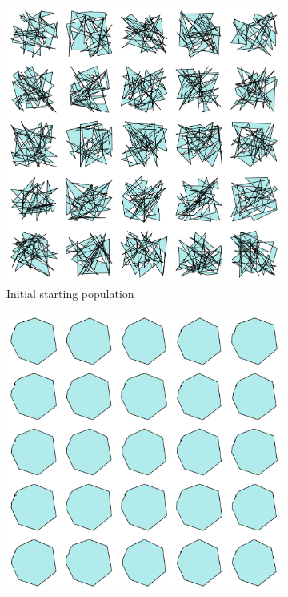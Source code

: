 \documentclass{article}
\begin{document}
\begin{figure}[H]
    \centering
    \begin{subfigure}[b]{0.45\textwidth}
        \centering
        \includegraphics[width=\textwidth]{figures/GAResults/GA4/50point_initial_pop.png}
        \caption{Initial starting population}
        \label{fig:GA4_starting}
    \end{subfigure}
    \hfill
    \begin{subfigure}[b]{0.45\textwidth}
        \centering
        \includegraphics[width=\textwidth]{figures/GAResults/GA4/final_population.png}

\end{subfigure}
\end{figure}
\end{document}
